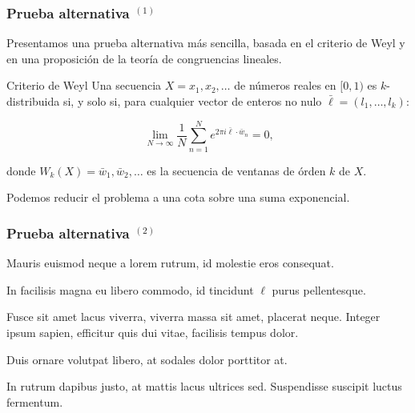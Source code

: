 \documentclass[t, 10pt, mathserif]{beamer}
\begin{document}

\begin{frame}
  \frametitle{Prueba alternativa {$^{(1)}$}}

  Presentamos una prueba alternativa más sencilla, basada en el criterio de Weyl y en una proposición de la teoría de congruencias lineales.
  \pause

  \medskip
  \begin{block}{Criterio de Weyl}
    \medskip
    Una secuencia $X = x_1, x_2, \dots$ de números reales en $[0, 1)$ es $k$-distribuida si, y solo si, para cualquier vector de enteros no nulo $\bar{\ell} = (l_1, \dots, l_k)$:
    \pause

    \begin{equation*}
      \lim_{N \to \infty} \frac{1}{N} \sum_{n = 1}^{N} e^{2 \pi i \bar{\ell} \cdot \bar{w}_n} = 0 \text{,}
    \end{equation*}

    donde $W_k(X) = \bar{w}_1, \bar{w}_2, \dots$ es la secuencia de ventanas de órden $k$ de $X$.
  \end{block}
  \pause

  Podemos reducir el problema a una cota sobre una suma exponencial.
\end{frame}


\begin{frame}
  \frametitle{Prueba alternativa {$^{(2)}$}}

  Mauris euismod neque a lorem rutrum, id molestie eros consequat.
  \pause
  
  In facilisis magna eu libero commodo, id tincidunt {\color{magenta} $\ell$} purus pellentesque.
  \pause

  \medskip
  \begin{definition}
    Fusce sit amet lacus viverra, viverra massa sit amet, placerat neque. Integer ipsum sapien, efficitur quis dui vitae, facilisis tempus dolor.
    \pause

    Duis ornare volutpat libero, at sodales dolor porttitor at.
    \pause
  \end{definition}

  In rutrum dapibus justo, at mattis lacus ultrices sed. Suspendisse suscipit luctus fermentum.
\end{frame}

\end{document}
